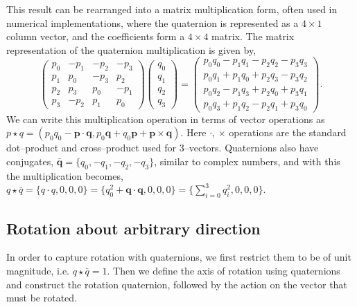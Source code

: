 \documentclass{article}
\def\q{\mathbf{q}}
\def\p{\mathbf{p}}
\begin{document}
\noindent This result can be rearranged into a matrix multiplication form, often used in numerical implementations, where the quaternion is represented as a \( 4 \times 1 \) column vector, and the coefficients form a \( 4 \times 4 \) matrix. The matrix representation of the quaternion multiplication is given by, 
\[
\begin{pmatrix}
p_0 & -p_1 & -p_2 & -p_3 \\
p_1 & p_0 & -p_3 & p_2 \\
p_2 & p_3 & p_0 & -p_1 \\
p_3 & -p_2 & p_1 & p_0 
\end{pmatrix}
\begin{pmatrix}
q_0 \\
q_1 \\
q_2 \\
q_3
\end{pmatrix}
=
\begin{pmatrix}
p_0 q_0 - p_1 q_1 - p_2 q_2 - p_3 q_3 \\
p_0 q_1 + p_1 q_0 + p_2 q_3 - p_3 q_2 \\
p_0 q_2 - p_1 q_3 + p_2 q_0 + p_3 q_1 \\
p_0 q_3 + p_1 q_2 - p_2 q_1 + p_3 q_0
\end{pmatrix}.
\]
\noindent We can write this multiplication operation in terms of vector operations as $p \star q = (p_0q_0 - \p \cdot \q, p_0 \q + q_0 \p + \p \times \q)$. Here $\cdot$, $\times$ operations are the standard dot--product and cross--product used for 3--vectors. Quaternions also have conjugates, $\bar{\q} = \{q_0, -q_1, -q_2, -q_3\}$, similar to complex numbers, and with this the multiplication becomes, $q \star \bar{q} = \{ q \cdot q, 0 , 0 , 0\} = \{ q_0^2 + \q \cdot \q, 0, 0, 0 \} = \{\sum_{i=0}^3 q_i^2, 0, 0, 0\}$.

\subsection{Rotation about arbitrary direction}
In order to capture rotation with quaternions, we first restrict them to be of unit magnitude, i.e. $q \star \bar{q} = 1$. Then we define the axis of rotation using quaternions and construct the rotation quaternion, followed by the action on the vector that must be rotated.
\end{document}

